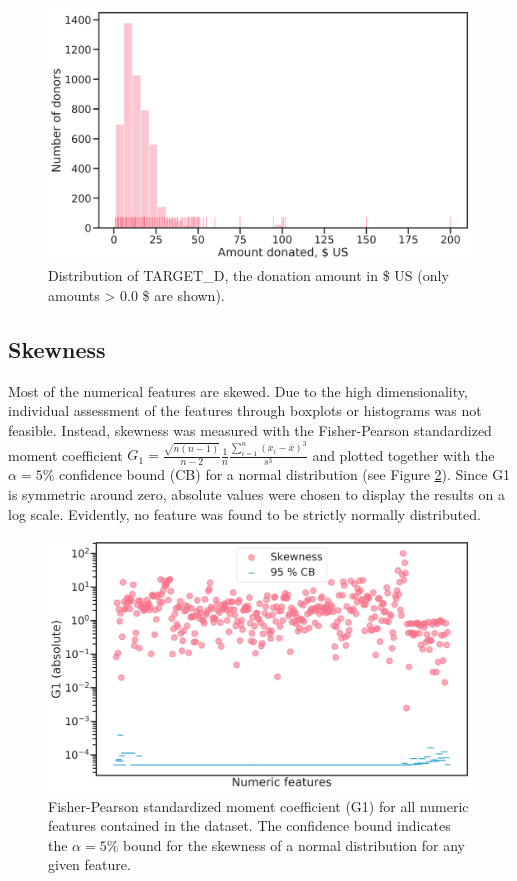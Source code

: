 \documentclass[
  11pt,
  a4paper,
  DIV=12,captions=tableheading,oneside,titlepage]{scrbook}
\begin{document}
\begin{figure}

{\centering \includegraphics[width=0.7\linewidth]{figures/eda/target-distribution} 

}

\caption{Distribution of TARGET\_D, the donation amount in \$ US (only amounts \textgreater{} 0.0 \$ are shown).}\label{fig:target-d-distrib}
\end{figure}

\hypertarget{skewness}{%
\subsection{Skewness}\label{skewness}}

Most of the numerical features are skewed. Due to the high dimensionality, individual assessment of the features through boxplots or histograms was not feasible. Instead, skewness was measured with the Fisher-Pearson standardized moment coefficient \(G_1 = \frac{\sqrt{n(n-1)}}{n-2} \frac{1}{n} \frac{\sum_{i=1}^n (x_i-\bar{x})^3}{s^3}\) and plotted together with the \(\alpha=5 \%\) confidence bound (CB) for a normal distribution (see Figure \ref{fig:skew-all}). Since G1 is symmetric around zero, absolute values were chosen to display the results on a log scale. Evidently, no feature was found to be strictly normally distributed.



\begin{figure}

{\centering \includegraphics[width=0.7\linewidth]{figures/eda/skewness-numeric-features} 

}

\caption{Fisher-Pearson standardized moment coefficient (G1) for all numeric features contained in the dataset. The confidence bound indicates the \(\alpha = 5 \%\) bound for the skewness of a normal distribution for any given feature.}\label{fig:skew-all}
\end{figure}
\end{document}
